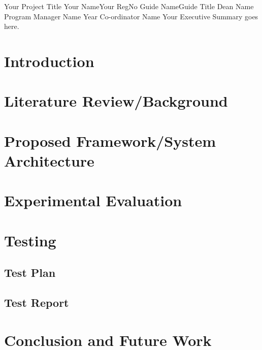 \documentclass{vitmsprojectreport}
\begin{document}
\makestartingpages
{Your Project Title}
{Your Name}{Your RegNo}
{Guide Name}{Guide Title}
{Dean Name}
{Program Manager Name}
{Year Co-ordinator Name}
{
	Your Executive Summary goes here.
}


\chapter{Introduction}

\chapter{Literature Review/Background}

\chapter{Proposed Framework/System Architecture}

\chapter{Experimental Evaluation}

\chapter{Testing}

\section{Test Plan}

\section{Test Report}

\chapter{Conclusion and Future Work}

\end{document}
